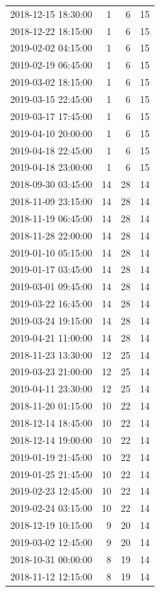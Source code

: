 \begin{tabular}{lrrr}
2018-12-15 18:30:00 & 1 & 6 & 15 \\
2018-12-22 18:15:00 & 1 & 6 & 15 \\
2019-02-02 04:15:00 & 1 & 6 & 15 \\
2019-02-19 06:45:00 & 1 & 6 & 15 \\
2019-03-02 18:15:00 & 1 & 6 & 15 \\
2019-03-15 22:45:00 & 1 & 6 & 15 \\
2019-03-17 17:45:00 & 1 & 6 & 15 \\
2019-04-10 20:00:00 & 1 & 6 & 15 \\
2019-04-18 22:45:00 & 1 & 6 & 15 \\
2019-04-18 23:00:00 & 1 & 6 & 15 \\
2018-09-30 03:45:00 & 14 & 28 & 14 \\
2018-11-09 23:15:00 & 14 & 28 & 14 \\
2018-11-19 06:45:00 & 14 & 28 & 14 \\
2018-11-28 22:00:00 & 14 & 28 & 14 \\
2019-01-10 05:15:00 & 14 & 28 & 14 \\
2019-01-17 03:45:00 & 14 & 28 & 14 \\
2019-03-01 09:45:00 & 14 & 28 & 14 \\
2019-03-22 16:45:00 & 14 & 28 & 14 \\
2019-03-24 19:15:00 & 14 & 28 & 14 \\
2019-04-21 11:00:00 & 14 & 28 & 14 \\
2018-11-23 13:30:00 & 12 & 25 & 14 \\
2019-03-23 21:00:00 & 12 & 25 & 14 \\
2019-04-11 23:30:00 & 12 & 25 & 14 \\
2018-11-20 01:15:00 & 10 & 22 & 14 \\
2018-12-14 18:45:00 & 10 & 22 & 14 \\
2018-12-14 19:00:00 & 10 & 22 & 14 \\
2019-01-19 21:45:00 & 10 & 22 & 14 \\
2019-01-25 21:45:00 & 10 & 22 & 14 \\
2019-02-23 12:45:00 & 10 & 22 & 14 \\
2019-02-24 03:15:00 & 10 & 22 & 14 \\
2018-12-19 10:15:00 & 9 & 20 & 14 \\
2019-03-02 12:45:00 & 9 & 20 & 14 \\
2018-10-31 00:00:00 & 8 & 19 & 14 \\
2018-11-12 12:15:00 & 8 & 19 & 14 \\

\end{tabular}
